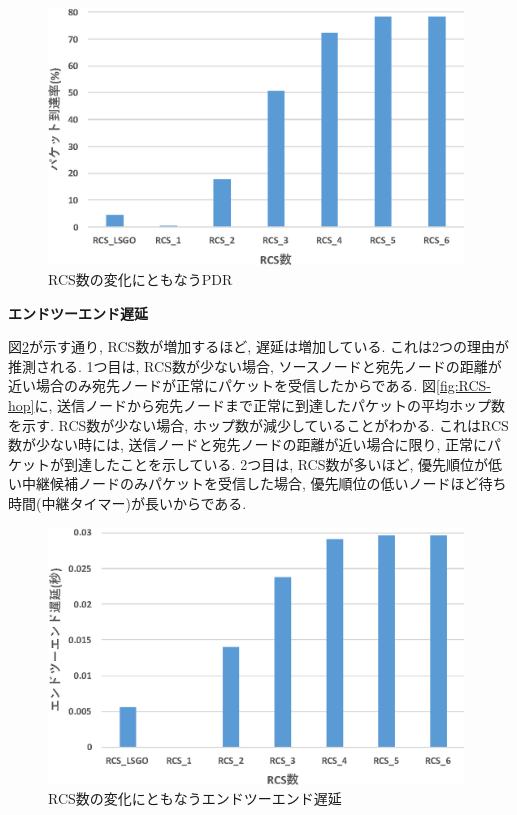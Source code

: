 \documentclass[10pt]{jreport}
\begin{document}
\begin{figure}[!ht]
	\centering
	\includegraphics[width=110mm]{figures/RCS_PDR.eps}
	\caption{RCS数の変化にともなうPDR}
	\label{fig:RCS-PDR}
\end{figure}

\par
\vspace{5mm}
\noindent
\textbf{エンドツーエンド遅延}
\vspace{5mm}

図\ref{fig:RCS-delay}が示す通り, RCS数が増加するほど, 遅延は増加している. これは2つの理由が推測される. 1つ目は, RCS数が少ない場合, ソースノードと宛先ノードの距離が近い場合のみ宛先ノードが正常にパケットを受信したからである. 図\ref{fig:RCS-hop}に, 送信ノードから宛先ノードまで正常に到達したパケットの平均ホップ数を示す. RCS数が少ない場合, ホップ数が減少していることがわかる. これはRCS数が少ない時には, 送信ノードと宛先ノードの距離が近い場合に限り, 正常にパケットが到達したことを示している.
2つ目は, RCS数が多いほど, 優先順位が低い中継候補ノードのみパケットを受信した場合, 優先順位の低いノードほど待ち時間(中継タイマー)が長いからである.


\begin{figure}[!ht]
	\centering
	\includegraphics[width=110mm]{figures/RCS_Delay.eps}
	\caption{RCS数の変化にともなうエンドツーエンド遅延}
	\label{fig:RCS-delay}
\end{figure}
\end{document}
